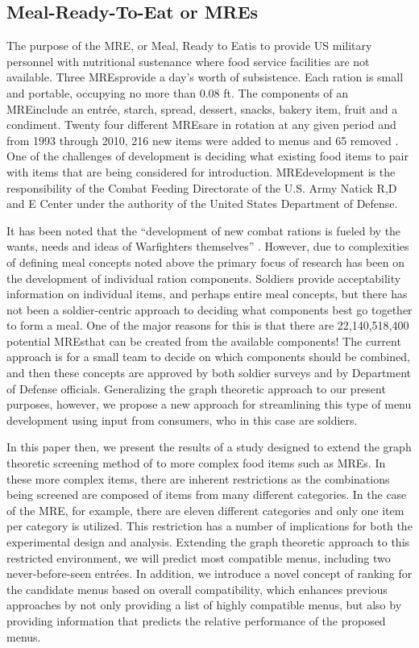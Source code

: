 \subsection{Meal-Ready-To-Eat or MREs}

The purpose of the MRE\tm, or Meal, Ready to Eat\tm is to provide US military personnel with nutritional sustenance where food service facilities are not available.  Three MREs\tm provide a day’s worth of subsistence.  Each ration is small and portable, occupying no more than 0.08 ft.   The components of an MRE\tm include an entrée, starch, spread, dessert, snacks, bakery item, fruit and a condiment.  Twenty four different MREs\tm are in rotation at any given period and from 1993 through 2010, 216 new items were added to menus and 65 removed \citep{RDECOM2010}.  One of the challenges of development is deciding what existing food items to pair with items that are being considered for introduction.  MRE\tm development is the responsibility of the Combat Feeding Directorate of the U.S. Army Natick R,D and E Center under the authority of the United States Department of Defense.

It has been noted that the “development of new combat rations is fueled by the wants, needs and ideas of Warfighters themselves” \citep{RDECOM2010}.  However, due to complexities of defining meal concepts noted above the primary focus of research has been on the development of individual ration components.  Soldiers provide acceptability information on individual items, and perhaps entire meal concepts, but there has not been a soldier-centric approach to deciding what components best go together to form a meal.  One of the major reasons for this is that there are 22,140,518,400 potential MREs\tm that can be created from the available components!  The current approach is for a small team to decide on which components should be combined, and then these concepts are approved by both soldier surveys and by Department of Defense officials.  Generalizing the graph theoretic approach to our present purposes, however, we propose a new approach for streamlining this type of menu development using input from consumers, who in this case are soldiers.

In this paper then, we present the results of a study designed to extend the graph theoretic screening method of \citet{Ennisa} to more complex food items such as MREs\tm.  In these more complex items, there are inherent restrictions as the combinations being screened are composed of items from many different categories.  In the case of the MRE\tm, for example,  there are eleven different categories and only one item per category is utilized. This restriction has a number of implications for both the experimental design and analysis.  Extending the graph theoretic approach to this restricted environment, we will predict most compatible menus, including two never-before-seen entrées.  In addition, we introduce a novel concept of ranking for the candidate menus based on overall compatibility, which enhances previous approaches by not only providing a list of highly compatible menus, but also by providing information that predicts the relative performance of the proposed menus.  

